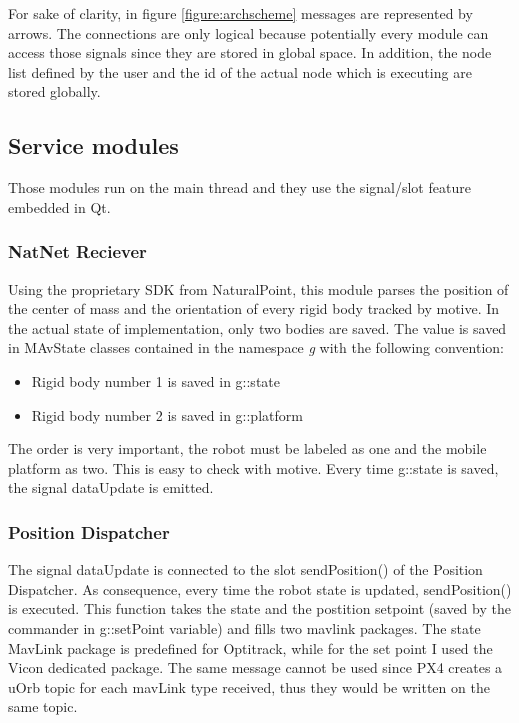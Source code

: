 For sake of clarity, in figure \ref{figure:archscheme} messages are represented by arrows. The connections are only logical because potentially every module can access those signals since they are stored in global space. In addition, the node list defined by the user and the id of the actual node which is executing are stored globally.

\subsection{Service modules}

Those modules run on the main thread and they use the signal/slot feature embedded in Qt. 

\subsubsection*{NatNet Reciever}

Using the proprietary SDK from NaturalPoint, this module parses the position of the center of mass and the orientation of every rigid body tracked by motive. In the actual state of implementation, only two bodies are saved. The value is saved in MAvState classes contained in the  namespace \textit{g} with the following convention: \begin{itemize}
\item Rigid body number 1 is saved in g::state 
\item Rigid body number 2 is saved in g::platform
\end{itemize}
The order is very important, the robot must be labeled as one and the mobile platform as two. This is easy to check with motive. Every time g::state is saved, the signal dataUpdate is emitted.
\subsubsection*{Position Dispatcher}

The signal dataUpdate is connected to the slot sendPosition() of the Position Dispatcher. As consequence, every time the robot state is updated, sendPosition() is executed. This function takes the state and the postition setpoint (saved by the commander in g::setPoint variable) and fills two mavlink packages. The state MavLink package is predefined for Optitrack, while for the set point I used the Vicon dedicated package. The same message cannot be used since PX4 creates a uOrb topic for each mavLink type received, thus they would be written on the same topic. 

